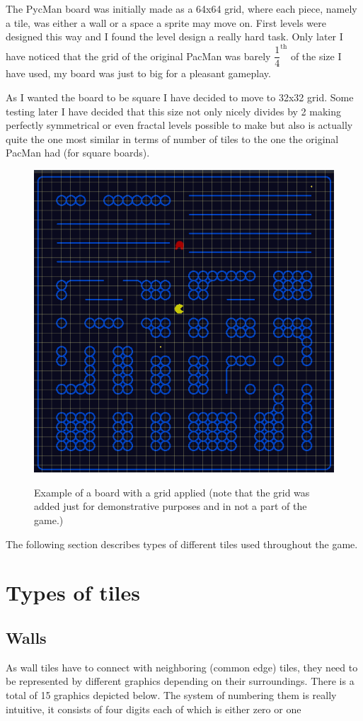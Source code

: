 \documentclass[11pt,a4paper]{report}
\newcommand{\dsubsection}[1]{\FloatBarrier \subsection{#1}}
\newenvironment{img}{
	\begin{center}
		\begin{figure}[H]
			\begin{center}
			
}{
	\end{center}
		\end{figure}
			\end{center}
}
\begin{document}
			The PycMan board was initially made as a 64x64 grid, where each piece, namely a tile, was either a wall or a space a sprite may move on. First levels were designed this way and I found the level design a really hard task. Only later I have noticed that the grid of the original PacMan was barely $\dfrac{1}{4}^{\text{th}}$ of the size I have used, my board was just to big for a pleasant gameplay.
			
			As I wanted the board to be square I have decided to move to 32x32 grid. Some testing later I have decided that this size not only nicely divides by 2 making perfectly symmetrical or even fractal levels possible to make but also is actually quite the one most similar in terms of number of tiles to the one the original PacMan had (for square boards).
			\begin{img}
				\includegraphics[width=350pt]{images/board_grid}\\
				\caption{Example of a board with a grid applied (note that the grid was added just for demonstrative purposes and in not a part of the game.)}
			\end{img}
			The following section describes types of different tiles used throughout the game.
		\section{Types of tiles}
			\dsubsection{Walls}
				\label{walls}
				As wall tiles have to connect with neighboring (common edge) tiles, they need to be represented by different graphics depending on their surroundings. 
				There is a total of 15 graphics depicted below. The system of numbering them is really intuitive, it consists of four digits each of which is either zero or one
				
\end{document}
